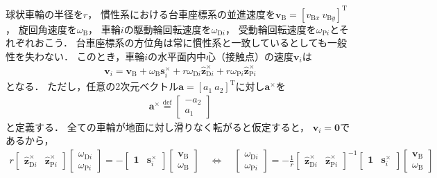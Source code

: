 ﻿\documentclass[a4paper]{jsarticle}
\begin{document}
球状車輪の半径を$r$，
慣性系における台車座標系の並進速度を$\bm{v}_{\mathrm{B}}=[v_{\mathrm{B}x}~v_{\mathrm{B}y}]^{\mathrm{T}}$，
旋回角速度を$\omega_{\mathrm{B}}$，
車輪$i$の駆動輪回転速度を$\omega_{\mathrm{D}i}$，
受動輪回転速度を$\omega_{\mathrm{P}i}$とそれぞれおこう．
台車座標系の方位角は常に慣性系と一致しているとしても一般性を失わない．
このとき，車輪$i$の水平面内中心（接触点）の速度$\bm{v}_{i}$は
\begin{align*}
\bm{v}_{i}
=\bm{v}_{\mathrm{B}}
+\omega_{\mathrm{B}}\bm{s}_{i}^{\times}
+r\omega_{\mathrm{D}i}\hat{\bm{z}}_{\mathrm{D}i}^{\times}
+r\omega_{\mathrm{P}i}\hat{\bm{z}}_{\mathrm{P}i}^{\times}
\end{align*}
となる．
ただし，任意の2次元ベクトル$\bm{a}=[a_{1}~a_{2}]^{\mathrm{T}}$に対し$\bm{a}^{\times}$を
\begin{align*}
\bm{a}^{\times}\overset{\mathrm{def}}{=}\begin{bmatrix} -a_{2} \\ a_{1} \end{bmatrix}
\end{align*}
と定義する．
全ての車輪が地面に対し滑りなく転がると仮定すると，
$\bm{v}_{i}=\bm{0}$であるから，
\begin{align*}
r\begin{bmatrix}
 \hat{\bm{z}}_{\mathrm{D}i}^{\times} & \hat{\bm{z}}_{\mathrm{P}i}^{\times}
\end{bmatrix}
\begin{bmatrix}
 \omega_{\mathrm{D}i} \\ \omega_{\mathrm{P}i}
\end{bmatrix}
=
-\begin{bmatrix}
 \bm{1} & \bm{s}_{i}^{\times}
\end{bmatrix}
\begin{bmatrix}
 \bm{v}_{\mathrm{B}} \\ \omega_{\mathrm{B}}
\end{bmatrix}
\quad\Leftrightarrow\quad
\begin{bmatrix}
 \omega_{\mathrm{D}i} \\ \omega_{\mathrm{P}i}
\end{bmatrix}
=
-\frac{1}{r}\begin{bmatrix}
 \hat{\bm{z}}_{\mathrm{D}i}^{\times} & \hat{\bm{z}}_{\mathrm{P}i}^{\times}
\end{bmatrix}^{-1}
\begin{bmatrix}
 \bm{1} & \bm{s}_{i}^{\times}
\end{bmatrix}
\begin{bmatrix}
 \bm{v}_{\mathrm{B}} \\ \omega_{\mathrm{B}}
\end{bmatrix}
\end{align*}
\end{document}
